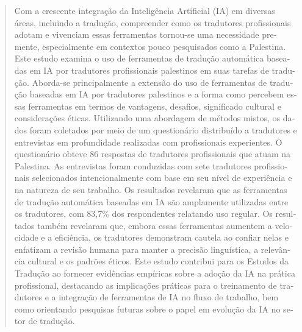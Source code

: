 \documentclass[english]{textolivre}
\begin{document}
\begin{polyabstract}
\begin{portuguese}
\begin{abstract}
Com a crescente integração da Inteligência Artificial (IA) em diversas áreas, incluindo a tradução, compreender como os tradutores profissionais adotam e vivenciam essas ferramentas tornou-se uma necessidade premente, especialmente em contextos pouco pesquisados como a Palestina. Este estudo examina o uso de ferramentas de tradução automática baseadas em IA por tradutores profissionais palestinos em suas tarefas de tradução. Aborda-se principalmente a extensão do uso de ferramentas de tradução baseadas em IA por tradutores palestinos e a forma como percebem essas ferramentas em termos de vantagens, desafios, significado cultural e considerações éticas. Utilizando uma abordagem de métodos mistos, os dados foram coletados por meio de um questionário distribuído a tradutores e entrevistas em profundidade realizadas com profissionais experientes. O questionário obteve 86 respostas de tradutores profissionais que atuam na Palestina. As entrevistas foram conduzidas com sete tradutores profissionais selecionados intencionalmente com base em seu nível de experiência e na natureza de seu trabalho. Os resultados revelaram que as ferramentas de tradução automática baseadas em IA são amplamente utilizadas entre os tradutores, com 83,7\% dos respondentes relatando uso regular. Os resultados também revelaram que, embora essas ferramentas aumentem a velocidade e a eficiência, os tradutores demonstram cautela ao confiar nelas e enfatizam a revisão humana para manter a precisão linguística, a relevância cultural e os padrões éticos. Este estudo contribui para os Estudos da Tradução ao fornecer evidências empíricas sobre a adoção da IA na prática profissional, destacando as implicações práticas para o treinamento de tradutores e a integração de ferramentas de IA no fluxo de trabalho, bem como orientando pesquisas futuras sobre o papel em evolução da IA no setor de tradução.

\end{abstract}
\end{portuguese}
\end{polyabstract}
\end{document}
